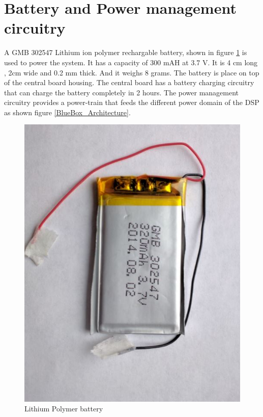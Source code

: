 \section{Battery and Power management circuitry}
 A GMB 302547 Lithium ion polymer rechargable battery, shown in figure \ref{fig:battery} is used to power the system. It has a capacity of 300 mAH at 3.7 V. It is 4 cm long , 2cm wide and 0.2 mm thick. And it weighs  8 grams. The battery is place on top of the central board housing. The central board has a battery charging circuitry that can charge the battery completely in 2 hours. The power management circuitry provides a power-train that feeds the different power domain of the DSP  as shown figure \ref{BlueBox_Architecture}.    
 \begin{figure}[h]
 	\centering
 	\includegraphics[scale = 0.5 ]{battery.JPG}
 	\caption{Lithium Polymer battery}\label{fig:battery}
 \end{figure}       
